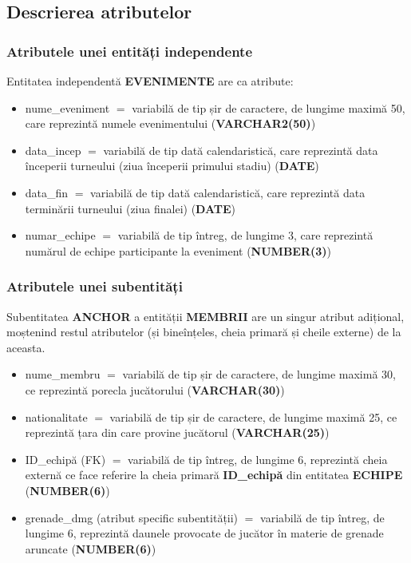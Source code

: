 \documentclass[a4paper,11pt]{article}
\begin{document}
\subsection{Descrierea atributelor}
\subsubsection{Atributele unei entități independente}
Entitatea independentă \textbf{EVENIMENTE} are ca atribute:
\begin{itemize}
    \item nume\_eveniment \texttt{$=$} variabilă de tip șir de caractere, de lungime maximă 50, care reprezintă numele evenimentului (\textbf{VARCHAR2(50)})
    \item data\_incep \texttt{$=$} variabilă de tip dată calendaristică, care reprezintă data începerii turneului (ziua începerii primului stadiu) (\textbf{DATE})
    \item data\_fin \texttt{$=$} variabilă de tip dată calendaristică, care reprezintă data terminării turneului (ziua finalei) (\textbf{DATE})
    \item numar\_echipe \texttt{$=$} variabilă de tip întreg, de lungime 3, care reprezintă numărul de echipe participante la eveniment (\textbf{NUMBER(3)})
\end{itemize}

\subsubsection{Atributele unei subentități} 
Subentitatea \textbf{ANCHOR} a entității \textbf{MEMBRII} are un singur atribut adițional, moștenind restul atributelor (și bineînțeles, cheia primară și cheile externe) de la aceasta.
\begin{itemize}
    \item nume\_membru \texttt{$=$} variabilă de tip șir de caractere, de lungime maximă 30, ce reprezintă porecla jucătorului (\textbf{VARCHAR(30)})
    \item nationalitate \texttt{$=$} variabilă de tip șir de caractere, de lungime maximă 25, ce reprezintă țara din care provine jucătorul (\textbf{VARCHAR(25)})
    \item ID\_echipă (FK) \texttt{$=$} variabilă de tip întreg, de lungime 6, reprezintă cheia externă ce face referire la cheia primară \textbf{ID\_echipă} din entitatea \textbf{ECHIPE} (\textbf{NUMBER(6)})
    \item grenade\_dmg (atribut specific subentității) \texttt{$=$} variabilă de tip întreg, de lungime 6, reprezintă daunele provocate de jucător în materie de grenade aruncate (\textbf{NUMBER(6)})
\end{itemize}
\end{document}

